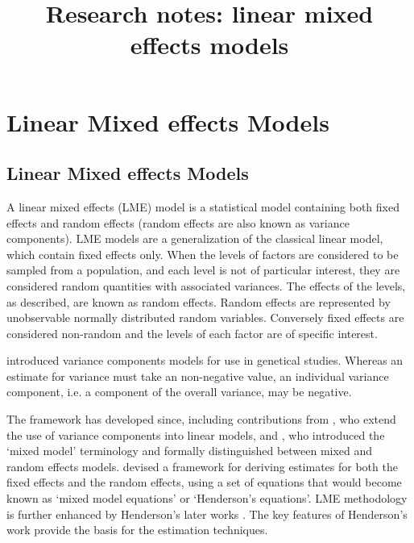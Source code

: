 \documentclass[12pt, a4paper]{report}
\title{Research notes: linear mixed effects models}
\author{ } \date{ }
\theoremstyle{plain}
\theoremstyle{definition}
\theoremstyle{remark}
\begin{document}
	\tableofcontents
	
	\chapter{Linear Mixed effects Models}
	
	
	\section{Linear Mixed effects Models}
	A linear mixed effects (LME) model is a statistical model containing both fixed effects and random effects (random effects are also known as variance components). LME models are a generalization of the classical linear model, which contain fixed effects only. When the levels of factors are considered to be sampled from a population, and each level is not of particular interest, they are considered random quantities with associated variances. The effects of the levels, as described, are known as random effects. Random effects are represented by unobservable normally distributed random variables. Conversely fixed effects are considered non-random and the levels of each factor are of specific interest.
	
	\citet{Fisher4} introduced variance components models for use in genetical studies. Whereas an estimate for variance must take an non-negative value, an individual variance component, i.e. a component of the overall variance, may be negative.
	
	
	The framework has developed since, including contributions from
	\citet{tippett}, who extend the use of variance components into linear models, and \citet{eisenhart}, who introduced the `mixed model' terminology and formally distinguished between mixed and random effects models. \citet{Henderson:1950} devised a framework for deriving estimates for both the fixed effects and the random effects, using a set of equations that would become known as `mixed model equations' or `Henderson's equations'.
	LME methodology is further enhanced by Henderson's later works \citep{Henderson53, Henderson59,Henderson63,Henderson73,Henderson84a}. The key features of Henderson's work provide the basis for the estimation techniques.
	
\end{document}
